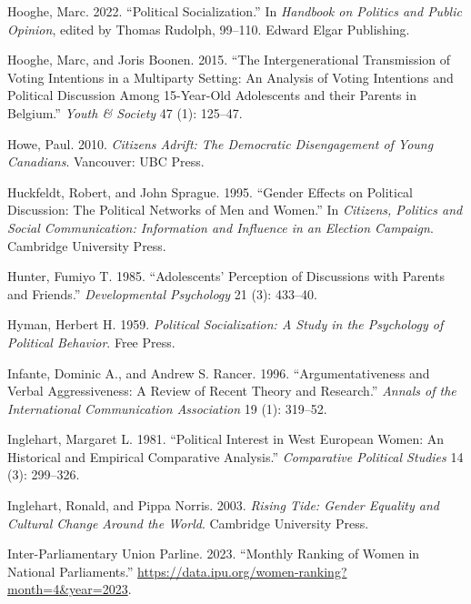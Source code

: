 \documentclass[
  letterpaper,
  DIV=11,
  numbers=noendperiod]{scrreprt}
\newlength{\cslhangindent}
\newenvironment{CSLReferences}[2] %
 {\begin{list}{}{%
  \setlength{\itemindent}{0pt}
  \setlength{\leftmargin}{0pt}
  \setlength{\parsep}{0pt}
  \ifodd #1
   \setlength{\leftmargin}{\cslhangindent}
   \setlength{\itemindent}{-1\cslhangindent}
  \fi
  \setlength{\itemsep}{#2\baselineskip}}}
 {\end{list}}
\begin{document}
\begin{CSLReferences}{1}{0}
Hooghe, Marc. 2022. {``{Political Socialization}.''} In \emph{Handbook
on Politics and Public Opinion}, edited by Thomas Rudolph, 99--110.
Edward Elgar Publishing.

Hooghe, Marc, and Joris Boonen. 2015. {``{The Intergenerational
Transmission of Voting Intentions in a Multiparty Setting: An Analysis
of Voting Intentions and Political Discussion Among 15-Year-Old
Adolescents and their Parents in Belgium}.''} \emph{Youth \& Society} 47
(1): 125--47.

Howe, Paul. 2010. \emph{{Citizens Adrift: The Democratic Disengagement
of Young Canadians}}. Vancouver: UBC Press.

Huckfeldt, Robert, and John Sprague. 1995. {``{Gender Effects on
Political Discussion: The Political Networks of Men and Women}.''} In
\emph{{Citizens, Politics and Social Communication: Information and
Influence in an Election Campaign}}. Cambridge University Press.

Hunter, Fumiyo T. 1985. {``{Adolescents' Perception of Discussions with
Parents and Friends}.''} \emph{Developmental Psychology} 21 (3):
433--40.

Hyman, Herbert H. 1959. \emph{{Political Socialization: A Study in the
Psychology of Political Behavior}}. Free Press.

Infante, Dominic A., and Andrew S. Rancer. 1996. {``{Argumentativeness
and Verbal Aggressiveness: A Review of Recent Theory and Research}.''}
\emph{Annals of the International Communication Association} 19 (1):
319--52.

Inglehart, Margaret L. 1981. {``{Political Interest in West European
Women: An Historical and Empirical Comparative Analysis}.''}
\emph{Comparative Political Studies} 14 (3): 299--326.

Inglehart, Ronald, and Pippa Norris. 2003. \emph{{Rising Tide: Gender
Equality and Cultural Change Around the World}}. Cambridge University
Press.

Inter-Parliamentary Union Parline. 2023. {``{Monthly Ranking of Women in
National Parliaments}.''}
\url{https://data.ipu.org/women-ranking?month=4&year=2023}.


\end{CSLReferences}
\end{document}
